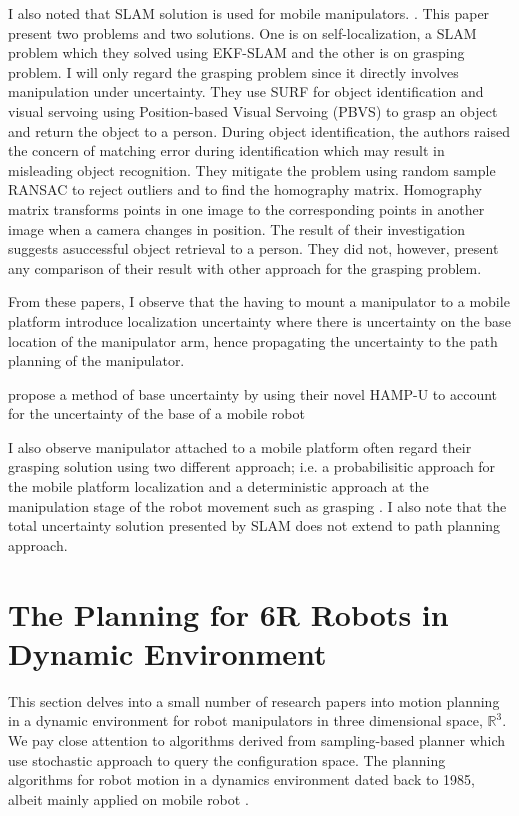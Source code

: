 I also noted that SLAM solution is used for mobile manipulators. \textcite{Song2013}. This
paper present two problems and two solutions. One is on self-localization, a SLAM problem
which they solved using EKF-SLAM and the other is on grasping problem. I will only regard
the grasping problem since it directly involves manipulation under uncertainty. They use \acrfull{SURF} for object identification and visual servoing using Position-based
Visual Servoing (PBVS) to grasp an object and return the object to a person. During object
identification, the authors raised the concern of matching error during identification which may
result in misleading object recognition. They mitigate the problem using random sample
RANSAC to reject outliers and to find the homography matrix.
Homography matrix transforms points in one image to the corresponding points in another
image when a camera changes in position. The result of their investigation 
suggests asuccessful object retrieval to a person. They did not, however, present any comparison of their
result with other approach for the grasping problem.

From these papers, I observe that the having to mount a manipulator to a mobile
platform introduce localization uncertainty where there is uncertainty on the base location of the
manipulator arm, hence propagating the uncertainty to the path planning of the manipulator.

\textcite{Pilania2015} propose a method of base uncertainty 
by using their novel \acrfull{HAMP-U} to account for
the uncertainty of the base of a mobile robot

I also observe manipulator attached to a mobile platform often regard their grasping
solution using two different approach; i.e. a probabilisitic approach for the mobile platform
localization and a deterministic approach at the manipulation stage of the robot movement such
as grasping \parencite{Venator2013, Gasparri2006}. I also note that the total uncertainty
solution presented by SLAM does not extend to path planning approach.

\section{The Planning for 6R Robots in Dynamic Environment}

This section delves into a small number of research papers 
into motion planning in a dynamic environment for robot manipulators in three
dimensional space, $\mathbb{R}^3$. We pay close attention to 
algorithms derived from sampling-based planner which use stochastic
approach to query the configuration space. 
The planning algorithms for robot motion in a dynamics environment
dated back to 1985, albeit mainly applied on
mobile robot \parencite{Mohanan2018}. 

